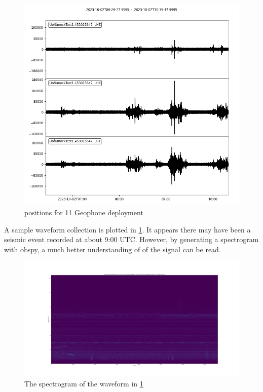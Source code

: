 \begin{figure}[h]    
    \centering
    \includegraphics[width=\textwidth]{reportImgs/high_gainPlot.png}
    \caption{positions for 11 Geophone deployment}    
    \label{wf}
\end{figure}

A sample waveform collection is plotted in \ref{wf}. It appears there may have been a seismic event recorded at about 9:00 UTC. However, by generating a spectrogram with obspy, a much better understanding of of the signal can be read.

\begin{figure}[h]
    \centering
    \includegraphics[width = \textwidth]{reportImgs/spectrogram1.png}
    \caption{The spectrogram of the waveform in \ref{wf}}    
    \label{spect1}
\end{figure}

